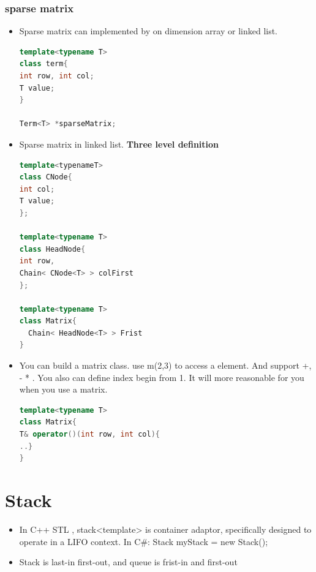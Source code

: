 \documentclass[a4paper,12pt,twoside]{book}
\begin{document}
\subsubsection{sparse matrix}
\begin{itemize}
\item Sparse matrix can implemented by on dimension array or  linked list. 
\begin{lstlisting}[frame=single, language=c++]
template<typename T>
class term{
int row, int col;
T value;
}

Term<T> *sparseMatrix;
\end{lstlisting}

\item Sparse matrix in linked list.  \textbf{Three level definition}
\begin{lstlisting}[frame=single, language=c++]
template<typenameT>
class CNode{
int col;
T value;
};

template<typename T>
class HeadNode{
int row, 
Chain< CNode<T> > colFirst
};
  
template<typename T>
class Matrix{
  Chain< HeadNode<T> > Frist
} 
\end{lstlisting}


\item You can build a matrix class. use m(2,3) to access a element. And support +, - * . You also can define index begin from 1. It will more reasonable for you when you use a matrix. 
\begin{lstlisting}[frame=single, language=c++]
template<typename T>
class Matrix{
T& operator()(int row, int col){
..}
}
\end{lstlisting} 

\end{itemize}

 
\section{Stack}
\begin{itemize}
\item In C++ STL , stack<template> is container adaptor, specifically designed to operate in a LIFO context. In C\#: Stack myStack = new Stack();

\item Stack is last-in first-out, and queue is frist-in and first-out

\end{itemize}
\end{document}
